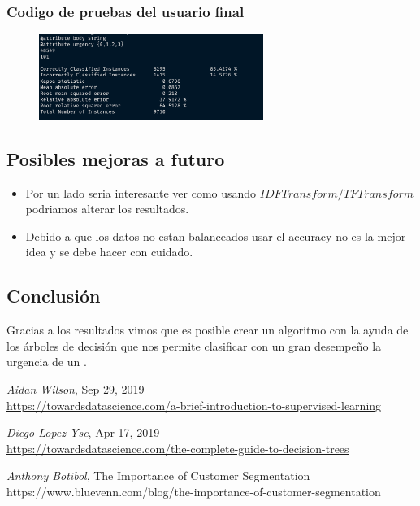 \documentclass[12pt, fleqn]{report}                             %
\newcommand \Quote              {\qq}                           %
\theoremstyle{break}                                            %
\begin{document}
        \subsubsection{Codigo de pruebas del usuario final}
        \begin{figure}[h!]
            \centering
            \includegraphics[width=0.65\textwidth]{result}
        \end{figure}



        \subsection{Posibles mejoras a futuro}

            \begin{itemize}
                \item Por un lado seria interesante ver como usando $IDFTransform/TFTransform$
                podriamos alterar los resultados.
                \item Debido a que los datos no estan balanceados usar el accuracy no es la mejor
                idea y se debe hacer con cuidado.
            \end{itemize}

        \subsection{Conclusión}

        Gracias a los resultados vimos que es posible crear un algoritmo con la ayuda de los árboles de decisión
        que nos permite clasificar con un gran desempeño la urgencia de un \Quote{support ticket}.



\begin{thebibliography}{10}

      \textit{Aidan Wilson}, 
      Sep 29, 2019 \\
      \url{https://towardsdatascience.com/a-brief-introduction-to-supervised-learning}

      \textit{Diego Lopez Yse}, 
      Apr 17, 2019 \\
      \url{https://towardsdatascience.com/the-complete-guide-to-decision-trees}

    \textit{Anthony Botibol}, 
    The Importance of Customer Segmentation\\
    https://www.bluevenn.com/blog/the-importance-of-customer-segmentation

\end{thebibliography}
\end{document}
